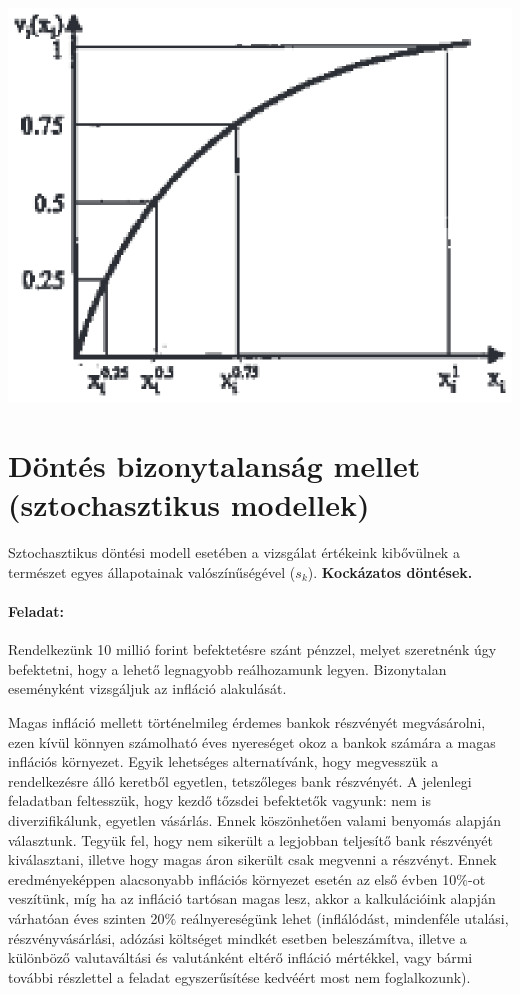 \documentclass[a4paper,12pt]{article}
\begin{document}
\begin{center}

\includegraphics[scale=0.7]{valuesample}
\\
\end{center}


\section{Döntés bizonytalanság mellet (sztochasztikus modellek)}

Sztochasztikus döntési modell esetében a vizsgálat értékeink kibővülnek a természet egyes állapotainak valószínűségével ($s_k$). \textbf{Kockázatos döntések.}

\paragraph{Feladat:} Rendelkezünk 10 millió forint befektetésre szánt pénzzel, melyet szeretnénk úgy befektetni, hogy a lehető legnagyobb reálhozamunk legyen. Bizonytalan eseményként vizsgáljuk az infláció alakulását.

Magas infláció mellett történelmileg érdemes bankok részvényét megvásárolni, ezen kívül könnyen számolható éves nyereséget okoz a bankok számára a magas inflációs környezet. Egyik lehetséges alternatívánk, hogy megvesszük a rendelkezésre álló keretből egyetlen, tetszőleges bank részvényét. A jelenlegi feladatban feltesszük, hogy kezdő tőzsdei befektetők vagyunk: nem is diverzifikálunk, egyetlen vásárlás. Ennek köszönhetően valami benyomás alapján választunk. Tegyük fel, hogy nem sikerült a legjobban teljesítő bank részvényét kiválasztani, illetve hogy magas áron sikerült csak megvenni a részvényt. Ennek eredményeképpen alacsonyabb inflációs környezet esetén az első évben 10$\%$-ot veszítünk, míg ha az infláció tartósan magas lesz, akkor a kalkulációink alapján várhatóan éves szinten 20$\%$ reálnyereségünk lehet (inflálódást, mindenféle utalási, részvényvásárlási, adózási költséget mindkét esetben beleszámítva, illetve a különböző valutaváltási és valutánként eltérő infláció mértékkel, vagy bármi további részlettel a feladat egyszerűsítése kedvéért most nem foglalkozunk).
\end{document}
